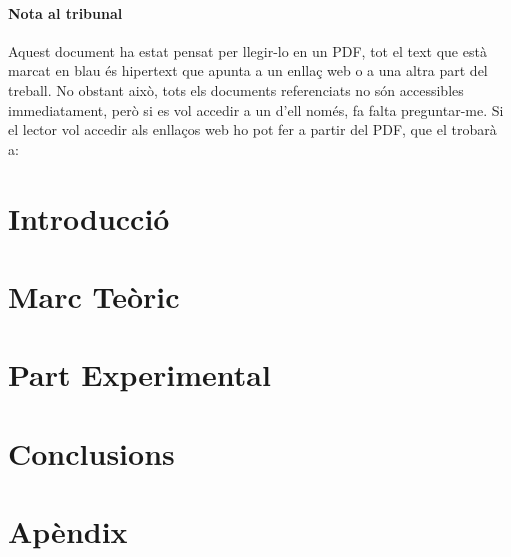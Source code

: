 \documentclass[a4paper,12pt,arial,numbered,print,index,oneside]{book}
\newcommand\blankpage{%
	\null
	\thispagestyle{empty}%
	\addtocounter{page}{-1}%
	\newpage}
\begin{document}
	\subsection{Nota al tribunal}
	Aquest document ha estat pensat per llegir-lo en un PDF, tot el text que està marcat en blau és hipertext que apunta a un enllaç web o a una altra part del treball. No obstant això, tots els documents referenciats no són accessibles immediatament, però si es vol accedir a un d'ell només, fa falta preguntar-me. Si el lector vol accedir als enllaços web ho pot fer a partir del PDF, que el trobarà a: \href{https://github.com/tomiock/qGAN}
	
	
	\afterpage{\blankpage}
	
	\part*{Introducció}
	\label{part:intro}
	
	
	\part{Marc Teòric}
	\label{part:theoretical_framework}
	
	
	\part{Part Experimental}
	\label{part:experimental_work}
	
	
	\part{Conclusions}
	\label{part:conclusions}
	
	
	\printglossaries
	
	\part{Apèndix}
	\begin{appendices}
		
	\end{appendices}

	
	
	
\end{document}
